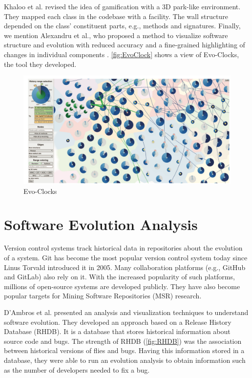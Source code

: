 Khaloo et al. \cite{Khaloo2017} revised the idea of gamification with a 3D park-like environment. They mapped each class in the codebase with a facility. The wall structure depended on the class' constituent parts, e.g., methods and signatures. 
Finally, we mention Alexandru et al., who proposed a method to visualize software structure and evolution 
with reduced accuracy and a fine-grained highlighting of changes in individual components \cite{Alexandru2019}. \autoref{fig:EvoClock} shows a view of Evo-Clocks, the tool they developed. 

\begin{figure}[ht]
\centering
  \includegraphics[width=0.9\linewidth]{Alexandru_EvoClock.png} 
  \caption{Evo-Clocks}
      \label{fig:EvoClock}

\end{figure}


\section{Software Evolution Analysis}

Version control systems track historical data in repositories about the evolution of a system. Git has become the most popular version control system today since Linus Torvald introduced it in 2005. Many collaboration platforms (e.g., GitHub and GitLab) also rely on it. With the increased popularity of such platforms, millions of open-source systems are developed publicly. They have also become popular targets for Mining Software Repositories (MSR) research.

D'Ambros et al. \cite{SoftwareEvolution} presented an analysis and visualization techniques to understand software evolution. 
They developed an approach based on a Release History Database (RHDB). 
It is a database that stores historical information about source code and bugs. 
The strength of RHDB (\autoref{fig:RHDB}) was the association between historical versions of flies and bugs. 
Having this information stored in a database, they were able to run an evolution analysis to obtain information such as the number of developers needed to fix a bug.   

